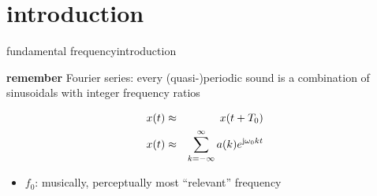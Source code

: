     \section[intro]{introduction}

	\begin{frame}{fundamental frequency}{introduction}
        \begin{block}{\textbf{remember}}
            Fourier series: every (quasi-)periodic sound is a combination of sinusoidals with integer frequency ratios
        \end{block}
        \begin{eqnarray*}
            x(t) 	&\approx& x(t+T_0)\nonumber\\
            x(t) &\approx& \sum\limits_{k=-\infty}^{\infty} a(k) {e}^{\mathrm{j}\omega_0kt}\nonumber
        \end{eqnarray*}
        
		\begin{itemize}
			\item<2->[]	$f_0$: musically, perceptually most ``relevant'' frequency
		\end{itemize}
	\end{frame}
	
    
